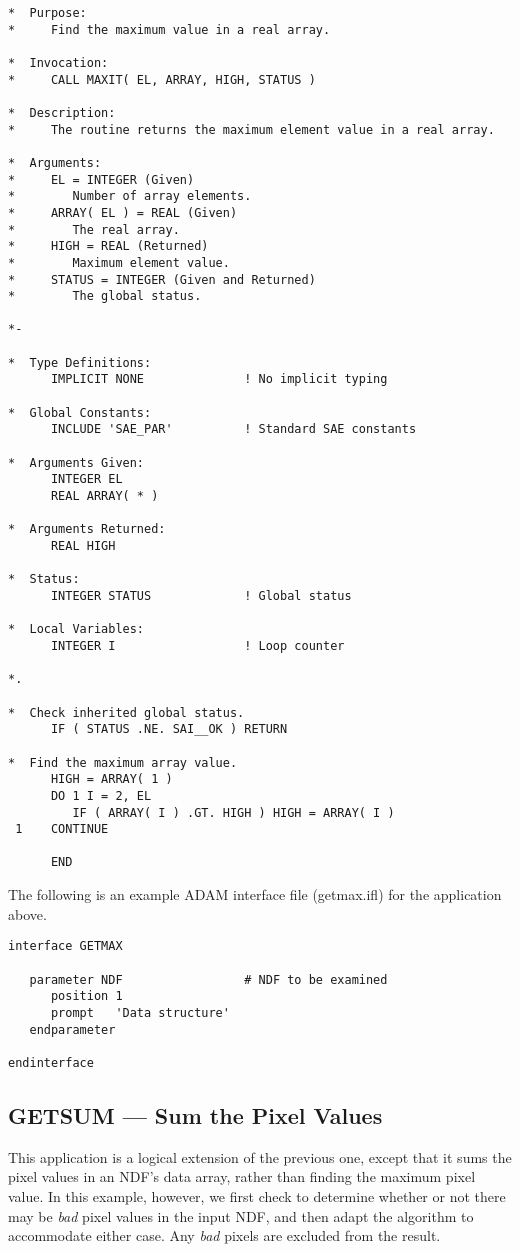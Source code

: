 \documentclass[twoside,11pt]{article}
\newcommand{\xref}[3]{#1}
\newcommand{\xlabel}[1]{}
\newcommand{\st}[1]{{\em{#1}}}
\begin{document}
\begin{verbatim}
*  Purpose:
*     Find the maximum value in a real array.

*  Invocation:
*     CALL MAXIT( EL, ARRAY, HIGH, STATUS )

*  Description:
*     The routine returns the maximum element value in a real array.

*  Arguments:
*     EL = INTEGER (Given)
*        Number of array elements.
*     ARRAY( EL ) = REAL (Given)
*        The real array.
*     HIGH = REAL (Returned)
*        Maximum element value.
*     STATUS = INTEGER (Given and Returned)
*        The global status.

*-
      
*  Type Definitions:
      IMPLICIT NONE              ! No implicit typing

*  Global Constants:
      INCLUDE 'SAE_PAR'          ! Standard SAE constants

*  Arguments Given:
      INTEGER EL
      REAL ARRAY( * )

*  Arguments Returned:
      REAL HIGH

*  Status:
      INTEGER STATUS             ! Global status

*  Local Variables:
      INTEGER I                  ! Loop counter

*.

*  Check inherited global status.
      IF ( STATUS .NE. SAI__OK ) RETURN

*  Find the maximum array value.
      HIGH = ARRAY( 1 )
      DO 1 I = 2, EL
         IF ( ARRAY( I ) .GT. HIGH ) HIGH = ARRAY( I )
 1    CONTINUE

      END
\end{verbatim}
\normalsize

The following is an example \xref{ADAM}{sg4}{} interface file
(getmax.ifl) for the application above.

\small
\begin{verbatim}
interface GETMAX

   parameter NDF                 # NDF to be examined
      position 1
      prompt   'Data structure'
   endparameter

endinterface
\end{verbatim}
\normalsize

\newpage
\subsection{\xlabel{GETSUM}GETSUM --- Sum the Pixel Values}

This application is a logical extension of the previous one, except that it sums
the pixel values in an NDF's data array, rather than finding the maximum pixel
value. In this example, however, we first check to determine whether or not
there may be \st{bad\/} pixel values in the input NDF, and then adapt the
algorithm to accommodate either case. Any \st{bad\/} pixels are excluded from
the result.
\end{document}
